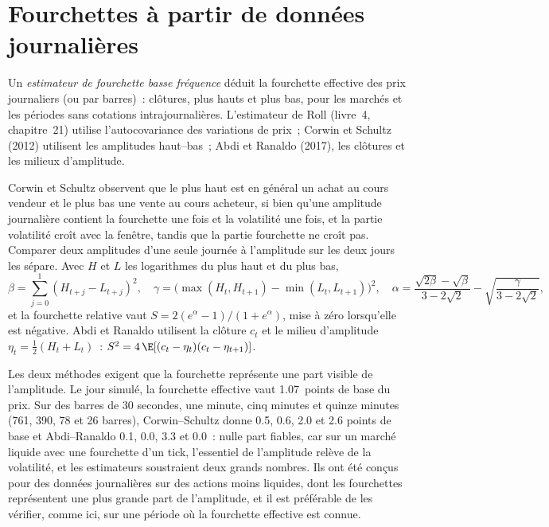 \section{Fourchettes à partir de données journalières}

\begin{definition}\label{def:mx:decomposing-the-spread:lowfreq}
Un \emph{estimateur de fourchette basse fréquence} déduit la fourchette effective des prix journaliers (ou par barres)~: clôtures, plus hauts et
plus bas, pour les marchés et les périodes sans cotations intrajournalières. L'estimateur de Roll (livre~4, chapitre~21) utilise l'autocovariance des variations de prix~;
Corwin et Schultz (2012) utilisent les amplitudes haut--bas~; Abdi et Ranaldo (2017), les clôtures et les milieux d'amplitude.
\end{definition}

Corwin et Schultz observent que le plus haut est en général un achat au cours vendeur et le plus bas une vente au cours acheteur, si bien qu'une amplitude journalière contient la fourchette une fois et la
volatilité une fois, et la partie volatilité croît avec la fenêtre, tandis que la partie fourchette ne croît pas. Comparer deux amplitudes d'une seule journée à l'amplitude sur les deux
jours les sépare. Avec $H$ et $L$ les logarithmes du plus haut et du plus bas,
\[
\beta=\sum_{j=0}^{1}(H_{t+j}-L_{t+j})^2,\quad \gamma=\bigl(\max(H_t,H_{t+1})-\min(L_t,L_{t+1})\bigr)^2,\quad
\alpha=\frac{\sqrt{2\beta}-\sqrt\beta}{3-2\sqrt2}-\sqrt{\frac{\gamma}{3-2\sqrt2}},
\]
et la fourchette relative vaut $S=2(e^\alpha-1)/(1+e^\alpha)$, mise à zéro lorsqu'elle est négative. Abdi et Ranaldo utilisent la clôture $c_t$ et le milieu d'amplitude
$\eta_t=\tfrac12(H_t+L_t)$~: $S^2=4\,\E[(c_t-\eta_t)(c_t-\eta_{t+1})]$.

Les deux méthodes exigent que la fourchette représente une part visible de l'amplitude. Le jour simulé, la fourchette effective vaut 1.07~points de base du prix. Sur des barres de 30
secondes, une minute, cinq minutes et quinze minutes (761, 390, 78 et 26 barres), Corwin--Schultz donne 0.5, 0.6, 2.0 et 2.6 points de base et Abdi--Ranaldo
0.1, 0.0, 3.3 et 0.0~: nulle part fiables, car sur un marché liquide avec une fourchette d'un tick, l'essentiel de l'amplitude relève de la volatilité, et les estimateurs soustraient
deux grands nombres. Ils ont été conçus pour des données journalières sur des actions moins liquides, dont les fourchettes représentent une plus grande part de l'amplitude, et il est préférable de les vérifier, comme ici,
sur une période où la fourchette effective est connue.


